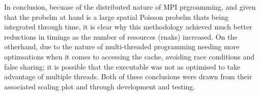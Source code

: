 In conclusion, becuase of the distributed nature of MPI prgroamming, and given that the probelm at hand is a large spatial Poisson probelm thats being integrated through time, it is clear why this methodology achieved much better reductions in timings as the number of resources (rnaks) increased.
On the otherhand, due to the nature of multi-threaded programming needing more optimsations when it comes to accessing the cache, avoiding race conditions and false sharing; it is possible that the executable was not as optimised to take advantage of multiple threads.
Both of these conclusions were drawn from their associated scaling plot and through development and testing.